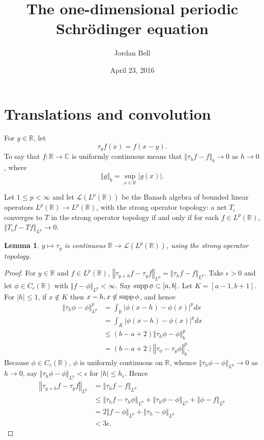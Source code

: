 \documentclass{article}
\newcommand{\supp}{\ensuremath\mathrm{supp}\,}
\newcommand{\norm}[1]{\left\Vert #1 \right\Vert}
\newtheorem{lemma}[theorem]{Lemma}
\theoremstyle{definition}
\begin{document}
\title{The one-dimensional periodic Schrödinger equation}
\author{Jordan Bell}
\date{April 23, 2016}

\maketitle


\section{Translations and convolution}
For $y \in \mathbb{R}$, let
\[
\tau_y f(x) =  f(x-y).
\]
To say that $f:\mathbb{R} \to \mathbb{C}$ is uniformly continuous means that
$\norm{\tau_h f-f}_b \to 0$ as $h \to 0$, where
\[
\norm{g}_b = \sup_{x \in \mathbb{R}} |g(x)|.
\]

Let $1 \leq p < \infty$ and
let $\mathscr{L}(L^p(\mathbb{R}))$ be the Banach algebra
of bounded linear operators $L^p(\mathbb{R}) \to L^p(\mathbb{R})$, with the strong operator topology:
a net $T_i$ converges to $T$ in the strong operator topology if and only if
for each $f \in L^p(\mathbb{R})$, $\norm{T_i f - Tf}_{L^p} \to 0$. 

\begin{lemma}
$y \mapsto \tau_y$ is continuous 
$\mathbb{R} \to \mathscr{L}(L^p(\mathbb{R}))$, using the strong operator
topology.
\end{lemma}
\begin{proof}
For $y \in \mathbb{R}$ and $f \in L^p(\mathbb{R})$, 
$\norm{\tau_{y+h} f - \tau_y f}_{L^p} = \norm{\tau_h f - f}_{L^p}$.
Take $\epsilon>0$ and 
let $\phi \in C_c(\mathbb{R})$ with $\norm{f-\phi}_{L^p}<\infty$.
Say $\supp \phi \subset [a,b]$. 
Let $K=[a-1,b+1]$. For $|h| \leq 1$, if $x \notin K$ then
$x-h,x \not \in \supp \phi$, and hence 
\begin{align*}
\norm{\tau_h \phi- \phi}_{L^p}^p& = \int_{\mathbb{R}} |\phi(x-h)-\phi(x)|^p dx\\
&=\int_K  |\phi(x-h)-\phi(x)|^p dx\\
&\leq (b-a+2) \norm{\tau_h \phi -  \phi}_b^p\\
&=(b-a+2) \norm{\tau_ \phi - \tau_y \phi}_b^p.
\end{align*}
Because $\phi \in C_c(\mathbb{R})$, $\phi$ is uniformly continuous on $\mathbb{R}$, whence 
$\norm{\tau_h \phi- \phi}_{L^p} \to 0$ as $h \to 0$, say 
$\norm{\tau_h \phi-\phi}_{L^p} < \epsilon$ for $|h| \leq h_\epsilon$. 
Hence
\begin{align*}
\norm{\tau_{y+h} f - \tau_y f}_{L^p} &= \norm{\tau_h f - f}_{L^p}\\
&\leq \norm{\tau_h f - \tau_h \phi}_{L^p} + \norm{\tau_h \phi - \phi}_{L^p} + \norm{\phi-f}_{L^p}\\
&=2 \norm{f-\phi}_{L^p} + \norm{\tau_h - \phi}_{L^p}\\
&<3\epsilon.
\end{align*}
\end{proof}
\end{document}
